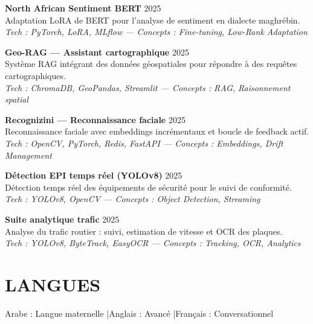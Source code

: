 \documentclass[a4paper,12pt]{article}
\begin{document}
{\textbf{North African Sentiment BERT} \hfill 2025 \\
Adaptation LoRA de BERT pour l’analyse de sentiment en dialecte maghrébin. \\
\textit{Tech : PyTorch, LoRA, MLflow — Concepts : Fine-tuning, Low-Rank Adaptation}

\textbf{Geo-RAG — Assistant cartographique} \hfill 2025 \\
Système RAG intégrant des données géospatiales pour répondre à des requêtes cartographiques. \\
\textit{Tech : ChromaDB, GeoPandas, Streamlit — Concepts : RAG, Raisonnement spatial}

\textbf{Recognizini — Reconnaissance faciale} \hfill 2025 \\
Reconnaissance faciale avec embeddings incrémentaux et boucle de feedback actif. \\
\textit{Tech : OpenCV, PyTorch, Redis, FastAPI — Concepts : Embeddings, Drift Management}

\textbf{Détection EPI temps réel (YOLOv8)} \hfill 2025 \\
Détection temps réel des équipements de sécurité pour le suivi de conformité. \\
\textit{Tech : YOLOv8, OpenCV — Concepts : Object Detection, Streaming}

\textbf{Suite analytique trafic} \hfill 2025 \\
Analyse du trafic routier : suivi, estimation de vitesse et OCR des plaques. \\
\textit{Tech : YOLOv8, ByteTrack, EasyOCR — Concepts : Tracking, OCR, Analytics}


}

\section{LANGUES}
Arabe : Langue maternelle \quad|\quad Anglais : Avancé \quad|\quad Français : Conversationnel
\end{document}
